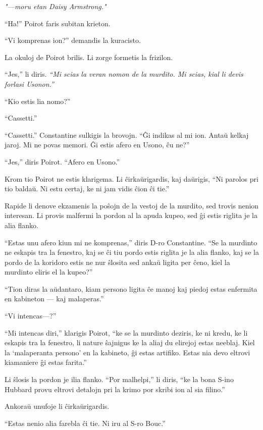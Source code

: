 \begin{center}\itshape "---moru etan Daisy Armstrong."\end{center}

``Ha!'' Poirot faris subitan krieton.

``Vi komprenas ion?'' demandis la kuracisto.

La okuloj de Poirot brilis. Li zorge formetis la frizilon.

``Jes,'' li diris. \emph{``Mi scias la veran nomon de la murdito. Mi scias, kial li devis forlasi Usonon.''}

``Kio estis lia nomo?''

``Cassetti.''

``Cassetti.'' Constantine sulkigis la brovojn. ``Ĝi indikas al mi ion. Antaŭ kelkaj jaroj. Mi ne povas memori. Ĝi estis afero en Usono, ĉu ne?''

``Jes,'' diris Poirot. ``Afero en Usono.''

Krom tio Poirot ne estis klarigema. Li ĉirkaŭrigardis, kaj daŭrigis, ``Ni parolos pri tio baldaŭ. Ni estu certaj, ke ni jam vidis ĉion ĉi tie.''

Rapide li denove ekzamenis la poŝojn de la vestoj de la murdito, sed trovis nenion interesan. Li provis malfermi la pordon al la apuda kupeo, sed ĝi estis riglita je la alia flanko.

``Estas unu afero kiun mi ne komprenas,'' diris D-ro Constantine. ``Se la murdinto ne eskapis tra la fenestro, kaj se ĉi tiu pordo estis riglita je la alia flanko, kaj se la pordo de la koridoro estis ne nur ŝlosita sed ankaŭ ligita per ĉeno, kiel la murdinto eliris el la kupeo?''

``Tion diras la aŭdantaro, kiam persono ligita ĉe manoj kaj piedoj estas enfermita en kabineton --- kaj malaperas.''

``Vi intencas---?''

``Mi intencas diri,'' klarigis Poirot, ``ke se la murdinto deziris, ke ni kredu, ke li eskapis tra la fenestro, li nature ŝajnigus ke la aliaj du elirejoj estas neeblaj. Kiel la `malaperanta persono' en la kabineto, ĝi estas artifiko. Estas nia devo eltrovi kiamaniere ĝi estas farita.''

Li ŝlosis la pordon je ilia flanko. ``Por malhelpi,'' li diris, ``ke la bona S-ino Hubbard provu eltrovi detalojn pri la krimo por skribi ion al sia filino.''

Ankoraŭ unufoje li ĉirkaŭrigardis.

``Estas nenio alia farebla ĉi tie. Ni iru al S-ro Bouc.''

